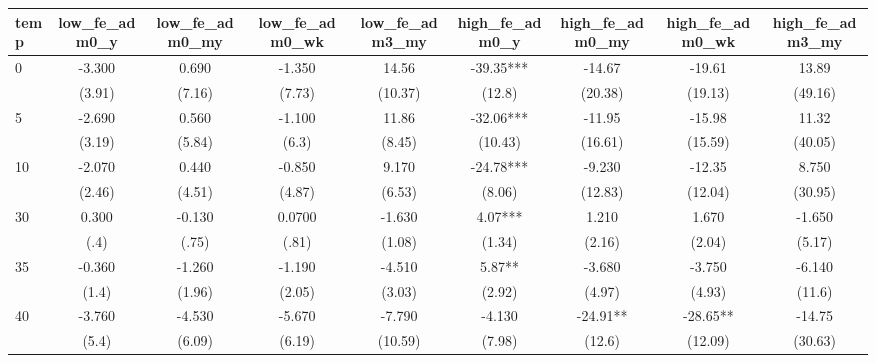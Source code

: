 \documentclass[]{article}
\begin{document}
\begin{tabular}{lcccccccc} \hline
temp & low\_fe\_adm0\_y & low\_fe\_adm0\_my & low\_fe\_adm0\_wk & low\_fe\_adm3\_my & high\_fe\_adm0\_y & high\_fe\_adm0\_my & high\_fe\_adm0\_wk & high\_fe\_adm3\_my \\ \hline
0 & -3.300 & 0.690 & -1.350 & 14.56 & -39.35*** & -14.67 & -19.61 & 13.89 \\
 & (3.91) & (7.16) & (7.73) & (10.37) & (12.8) & (20.38) & (19.13) & (49.16) \\
5 & -2.690 & 0.560 & -1.100 & 11.86 & -32.06*** & -11.95 & -15.98 & 11.32 \\
 & (3.19) & (5.84) & (6.3) & (8.45) & (10.43) & (16.61) & (15.59) & (40.05) \\
10 & -2.070 & 0.440 & -0.850 & 9.170 & -24.78*** & -9.230 & -12.35 & 8.750 \\
 & (2.46) & (4.51) & (4.87) & (6.53) & (8.06) & (12.83) & (12.04) & (30.95) \\
30 & 0.300 & -0.130 & 0.0700 & -1.630 & 4.07*** & 1.210 & 1.670 & -1.650 \\
 & (.4) & (.75) & (.81) & (1.08) & (1.34) & (2.16) & (2.04) & (5.17) \\
35 & -0.360 & -1.260 & -1.190 & -4.510 & 5.87** & -3.680 & -3.750 & -6.140 \\
 & (1.4) & (1.96) & (2.05) & (3.03) & (2.92) & (4.97) & (4.93) & (11.6) \\
40 & -3.760 & -4.530 & -5.670 & -7.790 & -4.130 & -24.91** & -28.65** & -14.75 \\
 & (5.4) & (6.09) & (6.19) & (10.59) & (7.98) & (12.6) & (12.09) & (30.63) \\ \hline
\end{tabular}
\end{document}
